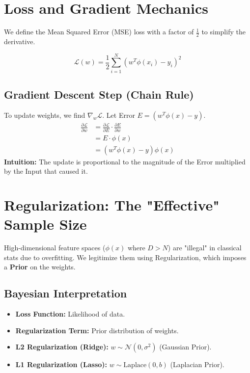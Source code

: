 \documentclass{article}
\begin{document}
\section{Loss and Gradient Mechanics}
We define the Mean Squared Error (MSE) loss with a factor of $\frac{1}{2}$ to simplify the derivative.

\begin{equation}
    \mathcal{L}(w) = \frac{1}{2} \sum_{i=1}^{N} (w^T \phi(x_i) - y_i)^2
\end{equation}

\subsection{Gradient Descent Step (Chain Rule)}
To update weights, we find $\nabla_w \mathcal{L}$. Let Error $E = (w^T \phi(x) - y)$.
\begin{align}
    \frac{\partial \mathcal{L}}{\partial w} &= \frac{\partial \mathcal{L}}{\partial E} \cdot \frac{\partial E}{\partial w} \\
    &= E \cdot \phi(x) \\
    &= (w^T \phi(x) - y) \phi(x)
\end{align}
\textbf{Intuition:} The update is proportional to the magnitude of the Error multiplied by the Input that caused it.

\section{Regularization: The "Effective" Sample Size}
High-dimensional feature spaces ($\phi(x)$ where $D > N$) are "illegal" in classical stats due to overfitting. We legitimize them using Regularization, which imposes a \textbf{Prior} on the weights.

\subsection{Bayesian Interpretation}
\begin{itemize}
    \item \textbf{Loss Function:} Likelihood of data.
    \item \textbf{Regularization Term:} Prior distribution of weights.
    \item \textbf{L2 Regularization (Ridge):} $w \sim \mathcal{N}(0, \sigma^2)$ (Gaussian Prior).
    \item \textbf{L1 Regularization (Lasso):} $w \sim \text{Laplace}(0, b)$ (Laplacian Prior).
\end{itemize}
\end{document}

